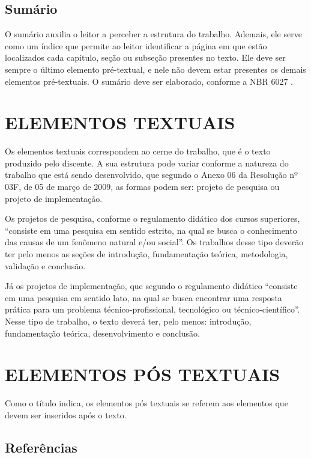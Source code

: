 \subsection{Sumário}

O sumário auxilia o leitor a perceber a estrutura do trabalho. Ademais, ele serve como um índice que permite ao leitor identificar a página em que estão localizados cada capítulo, seção ou subseção presentes no texto. Ele deve ser sempre o último elemento pré-textual, e nele não devem estar presentes os demais elementos pré-textuais. O sumário deve ser elaborado, conforme a NBR 6027 \cite{NBR6027:2003}.	

\section{ELEMENTOS TEXTUAIS}

Os elementos textuais correspondem ao cerne do trabalho, que é o texto produzido pelo discente. A sua estrutura pode variar conforme a natureza do trabalho que está sendo desenvolvido, que segundo o Anexo 06 da Resolução nº 03F, de 05 de março de 2009, as formas podem ser: projeto de pesquisa ou projeto de implementação.
	
Os projetos de pesquisa, conforme o regulamento didático dos cursos superiores, “consiste em uma pesquisa em sentido estrito, na qual se busca o conhecimento das causas de um fenômeno natural e/ou social”. Os trabalhos desse tipo deverão ter pelo menos as seções de introdução, fundamentação teórica, metodologia, validação e conclusão.
	
Já os projetos de implementação, que segundo o regulamento didático “consiste em uma pesquisa em sentido lato, na qual se busca encontrar uma resposta prática para um problema técnico-profissional, tecnológico ou técnico-científico”. Nesse tipo de trabalho, o texto deverá ter, pelo menos: introdução, fundamentação teórica, desenvolvimento e conclusão.

\section{ELEMENTOS PÓS TEXTUAIS}

Como o título indica, os elementos pós textuais se referem aos elementos que devem ser inseridos após o texto.

\subsection{Referências}

